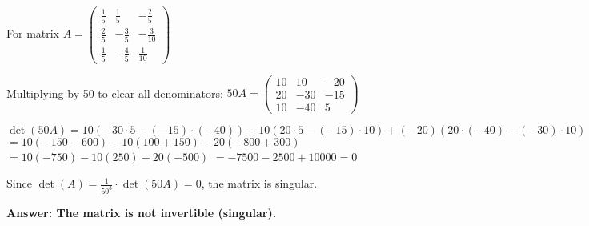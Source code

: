 For matrix $A = \begin{pmatrix}
\frac{1}{5} & \frac{1}{5} & -\frac{2}{5}\\
\frac{2}{5} & -\frac{3}{5} & -\frac{3}{10}\\
\frac{1}{5} & -\frac{4}{5} & \frac{1}{10}
\end{pmatrix}$

Multiplying by 50 to clear all denominators:
$50A = \begin{pmatrix}
10 & 10 & -20\\
20 & -30 & -15\\
10 & -40 & 5
\end{pmatrix}$

$\det(50A) = 10(-30 \cdot 5 - (-15) \cdot (-40)) - 10(20 \cdot 5 - (-15) \cdot 10) + (-20)(20 \cdot (-40) - (-30) \cdot 10)$
$= 10(-150 - 600) - 10(100 + 150) - 20(-800 + 300)$
$= 10(-750) - 10(250) - 20(-500)$
$= -7500 - 2500 + 10000 = 0$

Since $\det(A) = \frac{1}{50^3} \cdot \det(50A) = 0$, the matrix is singular.

\textbf{Answer: The matrix is not invertible (singular).}